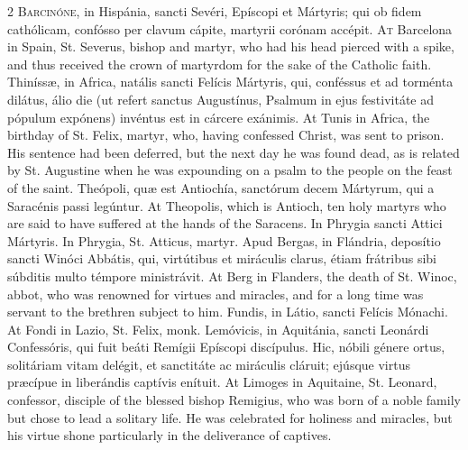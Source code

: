 \begin{paracol}{2}
\lettrine[lines=2]{B}{arcinóne,} in Hispánia, 
 sancti Sevéri, Epíscopi et Mártyris; qui ob fidem cathólicam, confósso per 
 clavum cápite, martyrii corónam accépit.
\switchcolumn
{}
\lettrine[lines=2]{A}{t} Barcelona in Spain, St. Severus, 
 bishop and martyr, who had his head pierced with a spike, and thus received 
 the crown of martyrdom for the sake of the Catholic faith.
\switchcolumn*
{}
Thiníssæ, in Africa, 
 natális sancti Felícis Mártyris, qui, conféssus et ad torménta dilátus, álio 
 die (ut refert sanctus Augustínus, Psalmum in ejus festivitáte ad pópulum 
 expónens) invéntus est in cárcere exánimis.
\switchcolumn
{}
At Tunis in Africa, the birthday of 
 St. Felix, martyr, who, having confessed Christ, was sent to prison. 
 His sentence had been deferred, but the next day he was found dead, as is 
 related by St. Augustine when he was expounding on a psalm to the people on 
 the feast of the saint.
\switchcolumn*
{}
Theópoli, quæ est 
 Antiochía, sanctórum decem Mártyrum, qui a Saracénis passi legúntur.
\switchcolumn
{}
At Theopolis, which is Antioch, ten 
 holy martyrs who are said to have suffered at the hands of the Saracens.
\switchcolumn*
{}
In Phrygia sancti 
 Attici Mártyris.
\switchcolumn
{}
In Phrygia, St. Atticus, martyr.
\switchcolumn*
{}
Apud Bergas, in 
 Flándria, deposítio sancti Winóci Abbátis, qui, virtútibus et miráculis 
 clarus, étiam frátribus sibi súbditis multo témpore ministrávit.
\switchcolumn
{}
At Berg in Flanders, the death of 
 St. Winoc, abbot, who was renowned for virtues and miracles, and for a long 
 time was servant to the brethren subject to him.
\switchcolumn*
{}
Fundis, in Látio, 
 sancti Felícis Mónachi.
\switchcolumn
{}
At Fondi in Lazio, St. Felix, monk.
\switchcolumn*
{}
Lemóvicis, in Aquitánia, sancti Leonárdi Confessóris, qui fuit beáti Remígii Epíscopi discípulus. 
 Hic, nóbili génere ortus, solitáriam vitam delégit, et sanctitáte ac 
 miráculis cláruit; ejúsque virtus præcípue in liberándis captívis enítuit.
\switchcolumn
{}
At Limoges in Aquitaine, St. 
 Leonard, confessor, disciple of the blessed bishop Remigius, who was born of 
 a noble family but chose to lead a solitary life. He was celebrated 
 for holiness and miracles, but his virtue shone particularly in the 
 deliverance of captives.
\switchcolumn*
{}
\end{paracol}


